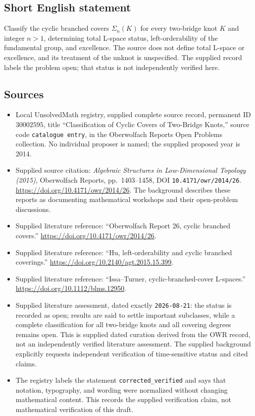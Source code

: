 \documentclass[11pt]{article}
\begin{document}
\subsection{Short English statement}
Classify the cyclic branched covers \(\Sigma_n(K)\) for every two-bridge knot \(K\) and integer \(n>1\), determining total L-space status, left-orderability of the fundamental group, and excellence. The source does not define total L-space or excellence, and its treatment of the unknot is unspecified. The supplied record labels the problem open; that status is not independently verified here.
\subsection{Sources}
\begin{itemize}
\item Local UnsolvedMath registry, supplied complete source record, permanent ID \(30002595\), title ``Classification of Cyclic Covers of Two-Bridge Knots,'' source code \texttt{catalogue entry}, in the Oberwolfach Reports Open Problems collection. No individual proposer is named; the supplied proposed year is 2014.
\item Supplied source citation: \emph{Algebraic Structures in Low-Dimensional Topology (2015)}, Oberwolfach Reports, pp.\ 1403--1458, DOI \texttt{10.4171/owr/2014/26}. \url{https://doi.org/10.4171/owr/2014/26}. The background describes these reports as documenting mathematical workshops and their open-problem discussions.
\item Supplied literature reference: ``Oberwolfach Report 26, cyclic branched covers.'' \url{https://doi.org/10.4171/owr/2014/26}.
\item Supplied literature reference: ``Hu, left-orderability and cyclic branched coverings.'' \url{https://doi.org/10.2140/agt.2015.15.399}.
\item Supplied literature reference: ``Issa--Turner, cyclic-branched-cover L-spaces.'' \url{https://doi.org/10.1112/blms.12950}.
\item Supplied literature assessment, dated exactly \texttt{2026-08-21}: the status is recorded as open; results are said to settle important subclasses, while a complete classification for all two-bridge knots and all covering degrees remains open. This is supplied dated curation derived from the OWR record, not an independently verified literature assessment. The supplied background explicitly requests independent verification of time-sensitive status and cited claims.
\item The registry labels the statement \texttt{corrected\_verified} and says that notation, typography, and wording were normalized without changing mathematical content. This records the supplied verification claim, not mathematical verification of this draft.
\end{itemize}
\end{document}
